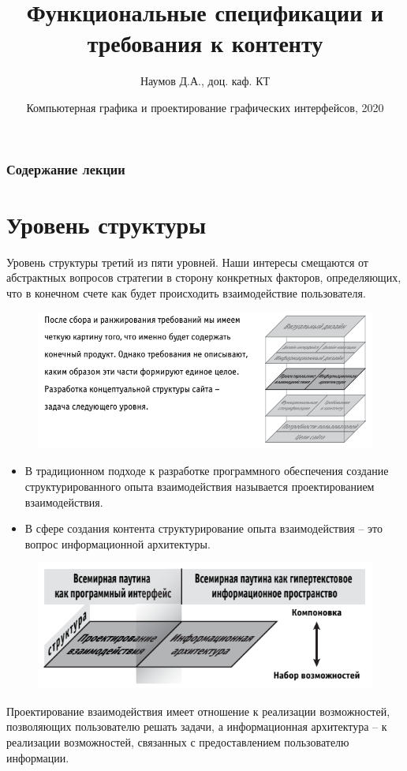 \documentclass{beamer}
\title[UX Elements]{Функциональные спецификации и требования к контенту}
\author{Наумов Д.А., доц. каф. КТ}
\date[23.09.2020] {Компьютерная графика и проектирование графических интерфейсов, 2020}
\begin{document}
\begin{frame}
  \titlepage
\end{frame}
  
\begin{frame}
  \frametitle{Содержание лекции}
  \tableofcontents  
\end{frame}

\section{Уровень структуры}
  
\begin{frame}[t]
\begin{block}{Уровень структуры}
третий из пяти уровней. Наши интересы смещаются от абстрактных вопросов стратегии в сторону конкретных факторов, определяющих, что в конечном счете как будет происходить взаимодействие пользователя.
\end{block}
\begin{figure}[h]
\centering
\includegraphics[scale=0.6]{images/lec03-pic01.png}
\end{figure}
\end{frame} 

\begin{frame}[t]
\begin{itemize}
\item В традиционном подходе к разработке программного обеспечения создание структурированного опыта взаимодействия называется проектированием взаимодействия. 
\item В сфере создания контента структурирование опыта взаимодействия – это вопрос информационной архитектуры. 
\end{itemize}
\begin{figure}[h]
\centering
\includegraphics[scale=0.4]{images/lec03-pic02.png}
\end{figure}
Проектирование взаимодействия имеет отношение к реализации возможностей, позволяющих пользователю решать задачи, а информационная архитектура – к реализации возможностей, связанных с предоставлением пользователю информации.
\end{frame} 
\end{document}
